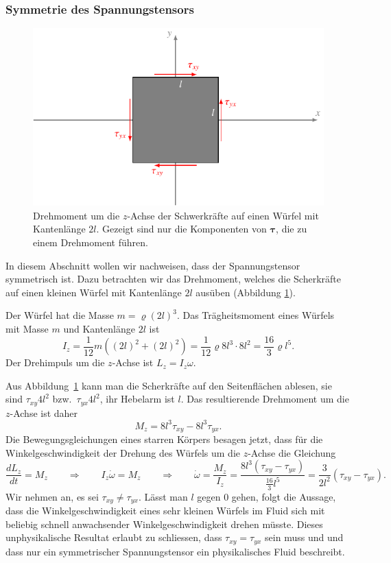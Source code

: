 \subsubsection{Symmetrie des Spannungstensors}
\label{skript:spannungstensor symmetrisch}
\begin{figure}
\centering
\includegraphics{chapters/2/drehmoment.pdf}
\caption{Drehmoment um die $z$-Achse der Schwerkräfte auf einen Würfel
mit Kantenlänge $2l$. Gezeigt sind nur die Komponenten von $\bm{\tau}$,
die zu einem Drehmoment führen.
\label{skript:drehmoment}}
\end{figure}
In diesem Abschnitt wollen wir nachweisen, dass der Spannungstensor
symmetrisch ist.
Dazu betrachten wir das Drehmoment, welches die Scherkräfte auf einen
kleinen Würfel mit Kantenlänge $2l$ ausüben (Abbildung \ref{skript:drehmoment}).

Der Würfel hat die Masse $m=\varrho(2l)^3$.
Das Trägheitsmoment eines Würfels mit Masse $m$ und Kantenlänge $2l$
ist
\[
I_z
=
\frac1{12}m((2l)^2+(2l)^2)
=
\frac1{12}\varrho 8l^3\cdot8l^2
=
\frac{16}{3}\varrho l^5.
\]
Der Drehimpuls um die $z$-Achse ist $L_z=I_z\omega$.

Aus Abbildung~\ref{skript:drehmoment} kann man die Scherkräfte auf den
Seitenflächen ablesen, sie sind $\tau_{xy}4l^2$ bzw.~$\tau_{yx}4l^2$,
ihr Hebelarm ist $l$.
Das resultierende Drehmoment um die $z$-Achse ist daher
\[
M_z = 8l^3\tau_{xy} - 8l^3\tau_{yx}.
\]
Die Bewegungsgleichungen eines starren Körpers besagen jetzt, dass
für die Winkelgeschwindigkeit der Drehung des Würfels um die $z$-Achse
die Gleichung
\[
\frac{dL_z}{dt}
=
M_z
\qquad\Rightarrow\qquad
I_z\dot\omega
=
M_z
\qquad\Rightarrow\qquad
\dot\omega
=
\frac{M_z}{I_z}
=
\frac{8l^3(\tau_{xy}-\tau_{yx})}{\frac{16}{3}l^5}
=
\frac{3}{2l^2}(\tau_{xy}-\tau_{yx}).
\]
Wir nehmen an, es sei $\tau_{xy}\ne\tau_{yx}$.
Lässt man $l$ gegen $0$ gehen, folgt die Aussage, dass die
Winkelgeschwindigkeit eines sehr kleinen Würfels im Fluid sich mit beliebig
schnell anwachsender Winkelgeschwindigkeit drehen müsste.
Dieses unphysikalische Resultat erlaubt zu schliessen, dass
$\tau_{xy}=\tau_{yx}$ sein muss und und dass nur ein
symmetrischer Spannungstensor ein physikalisches Fluid beschreibt.

